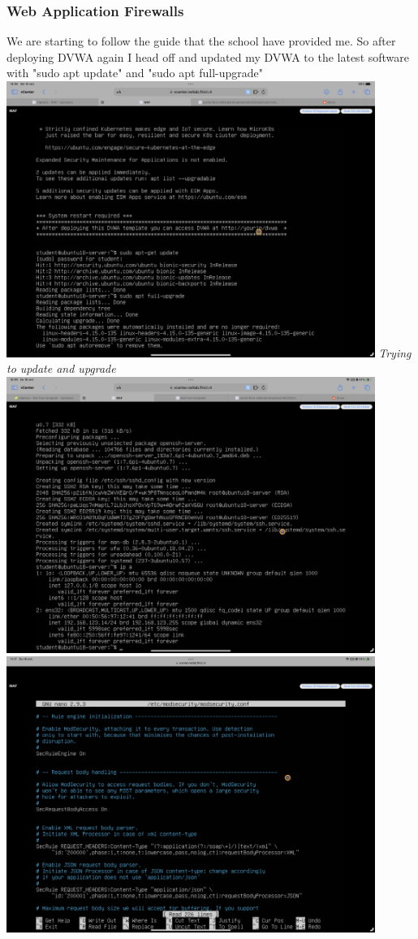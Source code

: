 \documentclass[12pt, letterpaper]{article}
\begin{document}
\subsubsection{Web Application Firewalls}
\hfill\break
We are starting to follow the guide that the school have provided me. So after deploying DVWA again I head off and updated my DVWA to the latest software with "sudo apt update" and "sudo apt full-upgrade"
\hfill\break
\includegraphics[width=0.9\textwidth]{fotos/Week 3/WAF/Update.png}
\emph{Trying to update and upgrade}
\hfill\break
\hfill\break
\includegraphics[width=0.9\textwidth]{fotos/Week 3/WAF/Openssh install.png}
\break
\includegraphics[width=0.9\textwidth]{fotos/Week 3/WAF/Modsecurity config.png}
\end{document}
